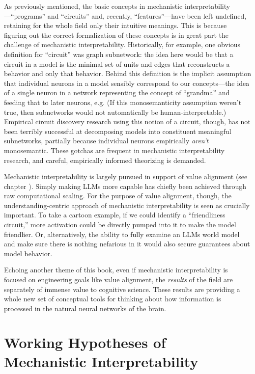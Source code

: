 As previously mentioned, the basic concepts in mechanistic
interpretability---``programs'' and ``circuits'' and, recently,
``features''---have been left undefined, retaining for the whole field only
their intuitive meanings. This is because figuring out the correct
formalization of these concepts is in great part the challenge of mechanistic
interpretability. Historically, for example, one obvious definition for
``circuit'' was graph subnetwork: the idea here would be that a circuit in a
model is the minimal set of units and edges that reconstructs a behavior and
only that behavior. Behind this definition is the implicit assumption that
individual neurons in a model sensibly correspond to our concepts---the idea of
a single neuron in a network representing the concept of ``grandma'' and
feeding that to later neurons, e.g. (If this monosemanticity assumption weren't
true, then subnetworks would not automatically be human-interpretable.)
Empirical circuit discovery research using this notion of a circuit, though,
has not been terribly successful at decomposing models into constituent
meaningful subnetworks, partially because individual neurons empirically
\emph{aren't} monosemantic. These gotchas are frequent in mechanistic
interpretability research, and careful, empirically informed theorizing is
demanded.

Mechanistic interpretability is largely pursued in support of value alignment
(see chapter ). Simply making LLMs more capable has
chiefly been achieved through raw computational scaling. For the purpose of
value alignment, though, the understanding-centric approach of mechanistic
interpretability is seen as crucially important. To take a cartoon example, if
we could identify a ``friendliness circuit,'' more activation could be directly
pumped into it to make the model friendlier. Or, alternatively, the ability to
fully examine an LLMs world model and make sure there is nothing nefarious in
it would also secure guarantees about model behavior.

Echoing another theme of this book, even if mechanistic
interpretability is focused on engineering
goals like value alignment, the \emph{results} of the field are separately of
immense value to cognitive science. These results are providing a whole new set
of conceptual tools for thinking about how information is processed in the
natural neural networks of the brain.

\section{Working Hypotheses of Mechanistic Interpretability}

